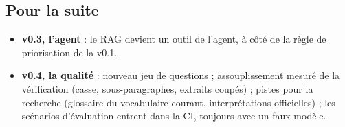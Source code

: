 \documentclass[11pt,a4paper]{article}
\begin{document}
\subsection{Pour la suite}

\begin{itemize}
  \item \textbf{v0.3, l'agent} : le RAG devient un outil de l'agent, à côté de la règle de priorisation de la v0.1.
  \item \textbf{v0.4, la qualité} : nouveau jeu de questions ; assouplissement mesuré de la vérification (casse, sous-paragraphes, extraits coupés) ; pistes pour la recherche (glossaire du vocabulaire courant, interprétations officielles) ; les scénarios d'évaluation entrent dans la CI, toujours avec un faux modèle.
\end{itemize}
\end{document}
